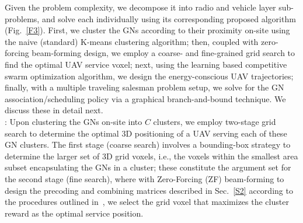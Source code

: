 \documentclass[10pt, twocolumn]{IEEEtran}
\begin{document}
Given the problem complexity, we decompose it into radio and vehicle layer sub-problems, and solve each individually using its corresponding proposed algorithm (Fig.~\ref{F3}). First, we cluster the GNs according to their proximity on-site using the naive (standard) K-means clustering algorithm; then, coupled with zero-forcing beam-forming design, we employ a coarse- and fine-grained grid search to find the optimal UAV service voxel; next, using the learning based competitive swarm optimization algorithm, we design the energy-conscious UAV trajectories; finally, with a multiple traveling salesman problem setup, we solve for the GN association/scheduling policy via a graphical branch-and-bound technique. We discuss these in detail next.\\
: Upon clustering the GNs on-site into $C$ clusters, we employ two-stage grid search to determine the optimal $3$D positioning of a UAV serving each of these GN clusters. The first stage (coarse search) involves a bounding-box strategy to determine the larger set of $3$D grid voxels, i.e., the voxels within the smallest area subset encapsulating the GNs in a cluster; these constitute the argument set for the second stage (fine search), where with Zero-Forcing (ZF) beam-forming to design the precoding and combining matrices described in Sec.~\ref{S2} according to the procedures outlined in~\cite{ZF, Core_SoA_1}, we select the grid voxel that maximizes the cluster reward as the optimal service position.\\
\end{document}
